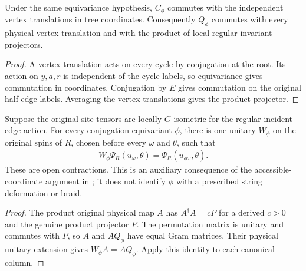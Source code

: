 \begin{lemma}%
    \label{thm:peps_regular_cycle_permutation_support}
    \leanok
    Under the same equivariance hypothesis, $C_\phi$ commutes with the
    independent vertex translations in tree coordinates. Consequently
    $Q_\phi$ commutes with every physical vertex translation and with the
    product of local regular invariant projectors.
\end{lemma}
\begin{proof}\leanok
    A vertex translation acts on every cycle by conjugation at the root.
    Its action on $y,a,r$ is independent of the cycle labels, so equivariance
    gives commutation in coordinates. Conjugation by $E$ gives commutation
    on the original half-edge labels. Averaging the vertex translations gives
    the product projector.
\end{proof}

\begin{lemma}%
    \label{thm:peps_regular_cycle_permutation_physical}
    \leanok
    Suppose the original site tensors are locally $G$-isometric for the regular
    incident-edge action. For every conjugation-equivariant $\phi$, there is
    one unitary $W_\phi$ on the original spins of $R$, chosen before every
    $\omega$ and $\theta$, such that
    \begin{align}
        W_\phi\Psi_R(u_\omega,\theta)
        =\Psi_R(u_{\phi\omega},\theta).
    \end{align}
    These are open contractions. This is an auxiliary consequence of the
    accessible-coordinate argument in \cite[Sections 6.2--6.3]{Schuch2010PEPS}; it
    does not identify $\phi$ with a prescribed string deformation or braid.
\end{lemma}
\begin{proof}\leanok
    The product original physical map $A$ has $A^\dagger A=cP$ for a derived
    $c>0$ and the genuine product projector $P$. The permutation matrix is
    unitary and commutes with $P$, so $A$ and $AQ_\phi$ have equal Gram
    matrices. Their physical unitary extension gives $W_\phi A=AQ_\phi$.
    Apply this identity to each canonical column.
\end{proof}
